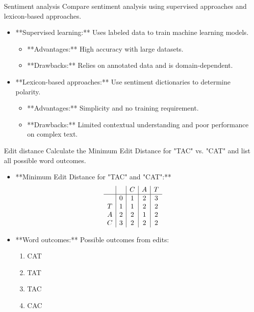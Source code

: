 \documentclass{article}
\begin{document}
\begin{exercise}{Sentiment analysis}
  Compare sentiment analysis using supervised approaches and lexicon-based approaches.

  \begin{solution}
    \begin{itemize}
        \item **Supervised learning:** Uses labeled data to train machine learning models.
        \begin{itemize}
            \item **Advantages:** High accuracy with large datasets.
            \item **Drawbacks:** Relies on annotated data and is domain-dependent.
        \end{itemize}
        \item **Lexicon-based approaches:** Use sentiment dictionaries to determine polarity.
        \begin{itemize}
            \item **Advantages:** Simplicity and no training requirement.
            \item **Drawbacks:** Limited contextual understanding and poor performance on complex text.
        \end{itemize}
    \end{itemize}
  \end{solution}
\end{exercise}

\begin{exercise}{Edit distance}
  Calculate the Minimum Edit Distance for "TAC" vs. "CAT" and list all possible word outcomes.

  \begin{solution}
    \begin{itemize}
        \item **Minimum Edit Distance for "TAC" and "CAT":**
        \[
        \begin{array}{c|c|c|c|c}
            &  & C & A & T \\
            \hline
            & 0 & 1 & 2 & 3 \\
            T & 1 & 1 & 2 & 2 \\
            A & 2 & 2 & 1 & 2 \\
            C & 3 & 2 & 2 & 2 \\
        \end{array}
        \]
        \item **Word outcomes:** Possible outcomes from edits:
        \begin{enumerate}
            \item CAT
            \item TAT
            \item TAC
            \item CAC
        \end{enumerate}
    \end{itemize}
  \end{solution}
\end{exercise}
\end{document}
